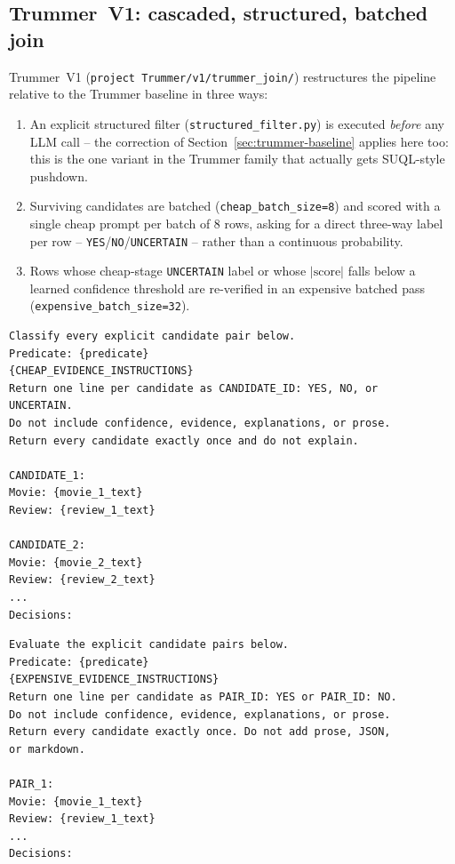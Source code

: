 \subsection{Trummer~V1: cascaded, structured, batched join}
\label{sec:trummer-v1}
Trummer~V1 (\texttt{project Trummer/v1/trummer\_join/}) restructures the
pipeline relative to the Trummer baseline in three ways:
\begin{enumerate}
  \item An explicit structured filter (\texttt{structured\_filter.py})
        is executed \emph{before} any LLM call -- the correction of
        Section~\ref{sec:trummer-baseline} applies here too: this is the
        one variant in the Trummer family that actually gets
        SUQL-style pushdown.
  \item Surviving candidates are batched (\texttt{cheap\_batch\_size=8})
        and scored with a single cheap prompt per batch of 8 rows,
        asking for a direct three-way label per row --
        \texttt{YES}/\texttt{NO}/\texttt{UNCERTAIN} -- rather than a
        continuous probability.
  \item Rows whose cheap-stage \texttt{UNCERTAIN} label or whose
        $|\text{score}|$ falls below a learned confidence threshold are
        re-verified in an expensive batched pass
        (\texttt{expensive\_batch\_size=32}).
\end{enumerate}

\begin{lstlisting}[style=prompt, caption={Cheap Stage~1 batched prompt, verbatim structure from \texttt{project Trummer/v1/trummer\_join/cascade.py} (\texttt{\_cheap\_batch\_prompt}).}, label={lst:trummer-v1-cheap}]
Classify every explicit candidate pair below.
Predicate: {predicate}
{CHEAP_EVIDENCE_INSTRUCTIONS}
Return one line per candidate as CANDIDATE_ID: YES, NO, or
UNCERTAIN.
Do not include confidence, evidence, explanations, or prose.
Return every candidate exactly once and do not explain.

CANDIDATE_1:
Movie: {movie_1_text}
Review: {review_1_text}

CANDIDATE_2:
Movie: {movie_2_text}
Review: {review_2_text}
...
Decisions:
\end{lstlisting}

\begin{lstlisting}[style=prompt, caption={Expensive Stage~2 batched verification prompt, verbatim structure from \texttt{cascade.py} (\texttt{\_expensive\_batch\_prompt}).}, label={lst:trummer-v1-expensive}]
Evaluate the explicit candidate pairs below.
Predicate: {predicate}
{EXPENSIVE_EVIDENCE_INSTRUCTIONS}
Return one line per candidate as PAIR_ID: YES or PAIR_ID: NO.
Do not include confidence, evidence, explanations, or prose.
Return every candidate exactly once. Do not add prose, JSON,
or markdown.

PAIR_1:
Movie: {movie_1_text}
Review: {review_1_text}
...
Decisions:
\end{lstlisting}

